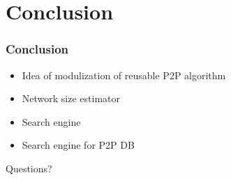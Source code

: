 \documentclass[red]{beamer}
\begin{document}
\section{Conclusion}
\begin{frame}
\frametitle{Conclusion}
\begin{itemize}
\item Idea of modulization of reusable P2P algorithm 
\item Network size estimator
\item Search engine
\item Search engine for P2P DB
\end{itemize}
\end{frame}



\begin{frame}
\begin{center}
\centering                        \huge Questions?
\end{center}
\end{frame}

 
\end{document}
